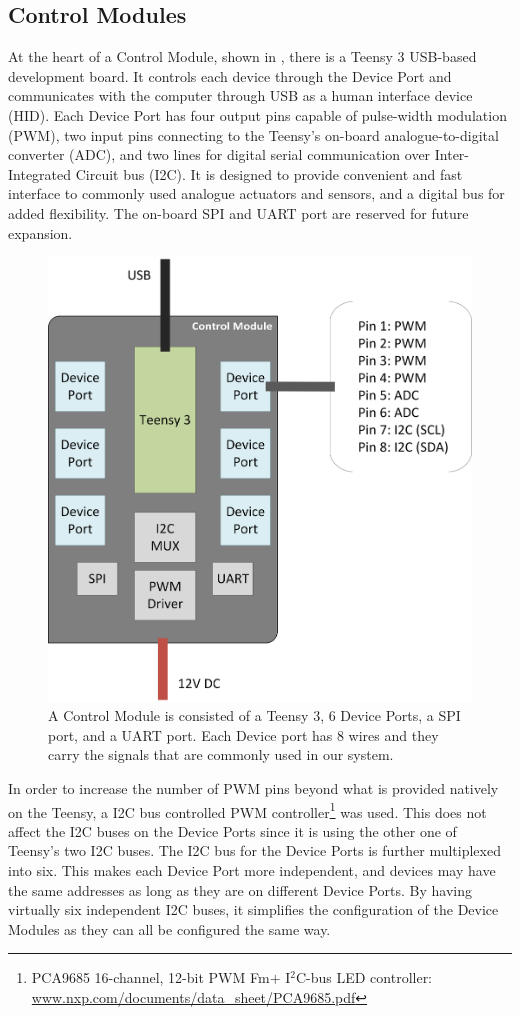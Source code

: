 \subsection{Control Modules}\label{subsec:controller}

At the heart of a Control Module, shown in , there is a Teensy 3 USB-based development board. It controls each device through the Device Port and communicates with the computer through USB as a human interface device (HID). Each Device Port has four output pins capable of pulse-width modulation (PWM), two input pins connecting to the Teensy's on-board analogue-to-digital converter (ADC), and two lines for digital serial communication over Inter-Integrated Circuit bus (I2C). It is designed to provide convenient and fast interface to commonly used analogue actuators and sensors, and a digital bus for added flexibility. The on-board SPI and UART port are reserved for future expansion.

\begin{figure}[!htbp]
	\centering
	\includegraphics[width=0.68 \textwidth]{"fig/interactive control system/Control_Module"}
	\caption[Block diagram of the Control Module]{A Control Module is consisted of a Teensy 3, 6 Device Ports, a SPI port, and a UART port. Each Device port has 8 wires and they carry the signals that are commonly used in our system.}
	\label{fig:Control_Module}
\end{figure}

In order to increase the number of PWM pins beyond what is provided natively on the Teensy, a I2C bus controlled PWM controller\footnote{PCA9685 16-channel, 12-bit PWM Fm$+$ I$^2$C-bus LED controller: \url{www.nxp.com/documents/data_sheet/PCA9685.pdf}} was used. This does not affect the I2C buses on the Device Ports since it is using the other one of Teensy's two I2C buses. The I2C bus for the Device Ports is further multiplexed into six. This makes each Device Port more independent, and devices may have the same addresses as long as they are on different Device Ports. By having virtually six independent I2C buses, it simplifies the configuration of the Device Modules as they can all be configured the same way.

